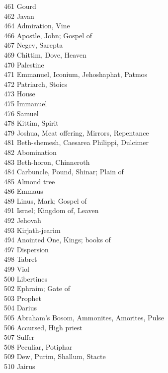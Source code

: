 461 \quad Gourd\\
462 \quad Javan\\
464 \quad Admiration, Vine\\
466 \quad Apostle, John; Gospel of\\
467 \quad Negev, Sarepta\\
469 \quad Chittim, Dove, Heaven\\
470 \quad Palestine\\
471 \quad Emmanuel, Iconium, Jehoshaphat, Patmos\\
472 \quad Patriarch, Stoics\\
473 \quad House\\
475 \quad Immanuel\\
476 \quad Samuel\\
478 \quad Kittim, Spirit\\
479 \quad Joshua, Meat offering, Mirrors, Repentance\\
481 \quad Beth-shemesh, Caesarea Philippi, Dulcimer\\
482 \quad Abomination\\
483 \quad Beth-horon, Chinneroth\\
484 \quad Carbuncle, Pound, Shinar; Plain of\\
485 \quad Almond tree\\
486 \quad Emmaus\\
489 \quad Linus, Mark; Gospel of\\
491 \quad Israel; Kingdom of, Leaven\\
492 \quad Jehovah\\
493 \quad Kirjath-jearim\\
494 \quad Anointed One, Kings; books of\\
497 \quad Dispersion\\
498 \quad Tabret\\
499 \quad Viol\\
500 \quad Libertines\\
502 \quad Ephraim; Gate of\\
503 \quad Prophet\\
504 \quad Darius\\
505 \quad Abraham’s Bosom, Ammonites, Amorites, Pulse\\
506 \quad Accursed, High priest\\
507 \quad Suffer\\
508 \quad Peculiar, Potiphar\\
509 \quad Dew, Purim, Shallum, Stacte\\
510 \quad Jairus\\
